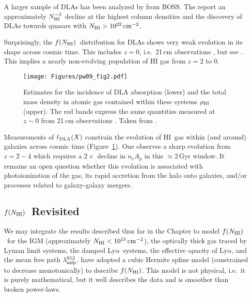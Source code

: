 \documentclass[graybox]{svmult}
\newcommand{\HI}{H{\sc I}}
\def\lya{Ly$\alpha$}
\newcommand{\mnhi}{N_{\rm HI}}
\def\cm#1{\, {\rm cm^{#1}}}
\def\mfnhi{f(\mnhi)}
\def\fnhi{$\mfnhi$}
\def\mlmfp{\lambda_{\rm mfp}^{912}}
\def\lmfp{$\mlmfp$}
\begin{document}
A larger sample of DLAs has been analyzed by \cite{noterdaeme+12}
from BOSS.
The report an approximately $\mnhi^{-3}$ decline at the highest column 
densities and the
discovery of DLAs towards quasars 
with $\mnhi > 10^{22} \cm{-2}$.


Surprisingly, the \fnhi\ distribution for DLAs shows
very weak evolution in its shape across cosmic time.
This includes $z=0$, i.e.\ 21\,cm observations 
\cite[]{zvb+05}, but see \cite{braun12}.
This implies a nearly non-evolving population of 
HI gas from $z=2$ to 0.

%
\begin{figure}[b]
\sidecaption
\texttt{[image: Figures/pw09\_fig2.pdf]}
%
%
\caption{Estimates for the incidence of DLA absorption (lower)
and the total mass density in atomic gas contained within these
systems $\rho_{\rm HI}$ (upper).
The red bands express the same quantities measured at $z \sim 0$
from 21\,cm observations \cite[]{zvb+05}.
Taken from \cite{pw09}.
}
\label{fig:pw09}       %
\end{figure}
  
Measurements of $\ell_{\rm DLA} (X)$ constrain the evolution of 
\HI\ gas within (and around) galaxies across cosmic time
(Figure~\ref{fig:pw09}).
One observes a  sharp evolution from $z=2-4$ which
requires a $2\times$ decline in $n_c A_p$ in this
$\approx 2$\,Gyr window. It remains an open question
whether this evolution is associated with photoionization
of the gas, its rapid accretion from the halo onto galaxies,
and/or processes related to galaxy-galaxy mergers.


\subsection{\fnhi\ Revisited}

We may integrate the results described thus far in the Chapter
to model \fnhi\ for the IGM (approximately $\mnhi < 10^{15} \cm{-2}$),
the optically thick gas traced by Lyman limit systems, 
the damped \lya\ systems, the effective opacity of \lya,
and the mean free path \lmfp.  \cite{pro+14} have 
adopted a cubic Hermite spline model (constrained to decrease
monotonically) to describe \fnhi.  
This model is not physical, i.e.\ it is purely mathematical, 
but it well describes the data and is
smoother than broken power-laws.
\end{document}
